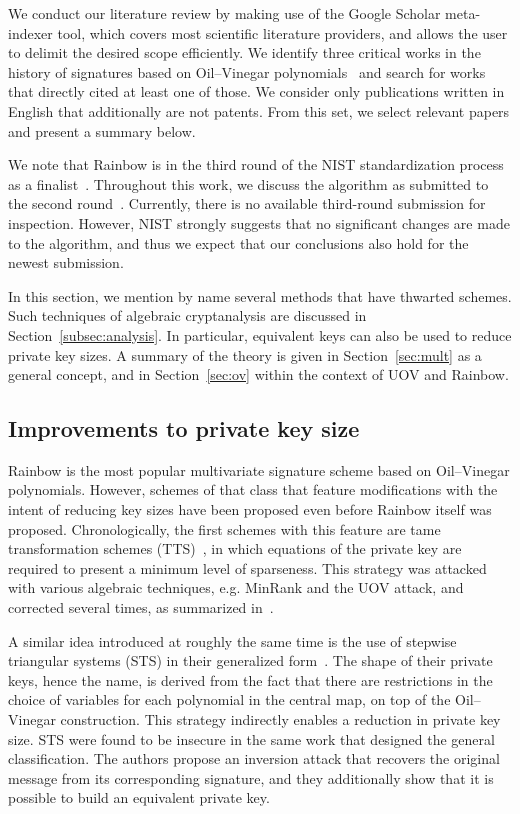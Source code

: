 \documentclass[12pt, a4paper, oneside]{memoir}
\theoremstyle{definition}
\begin{document}
We conduct our literature review by making use of the Google Scholar meta-indexer tool, which covers most scientific literature providers, and allows the user to delimit the desired scope efficiently. We identify three critical works in the history of signatures based on Oil--Vinegar polynomials~\cite{Patarin:199709,Kipnis:199904,Ding:200506} and search for works that directly cited at least one of those. We consider only publications written in English that additionally are not patents. From this set, we select relevant papers and present a summary below.

We note that Rainbow is in the third round of the NIST standardization process as a finalist~\cite[Sec.~3.20]{Alagic:202007}. Throughout this work, we discuss the algorithm as submitted to the second round~\cite{Ding:201901}. Currently, there is no available third-round submission for inspection. However, NIST strongly suggests that no significant changes are made to the algorithm, and thus we expect that our conclusions also hold for the newest submission.

In this section, we mention by name several methods that have thwarted schemes. Such techniques of algebraic cryptanalysis are discussed in Section~\ref{subsec:analysis}. In particular, equivalent keys can also be used to reduce private key sizes. A summary of the theory is given in Section~\ref{sec:mult} as a general concept, and in Section~\ref{sec:ov} within the context of UOV and Rainbow.

\subsection{Improvements to private key size}\label{subsec:priv}

Rainbow is the most popular multivariate signature scheme based on Oil--Vinegar polynomials. However, schemes of that class that feature modifications with the intent of reducing key sizes have been proposed even before Rainbow itself was proposed. Chronologically, the first schemes with this feature are tame transformation schemes (TTS)~\cite{Chen:200210}, in which equations of the private key are required to present a minimum level of sparseness. This strategy was attacked with various algebraic techniques, e.g. MinRank and the UOV attack, and corrected several times, as summarized in~\cite{Ding:200604}.

A similar idea introduced at roughly the same time is the use of stepwise triangular systems (STS) in their generalized form~\cite{Wolf:200603}. The shape of their private keys, hence the name, is derived from the fact that there are restrictions in the choice of variables for each polynomial in the central map, on top of the Oil--Vinegar construction. This strategy indirectly enables a reduction in private key size. STS were found to be insecure in the same work that designed the general classification. The authors propose an inversion attack that recovers the original message from its corresponding signature, and they additionally show that it is possible to build an equivalent private key.
\end{document}
